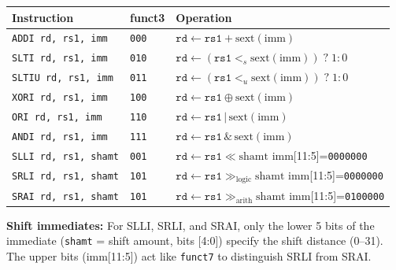 \documentclass[12pt, a4paper, oneside]{book}
\begin{document}
\begin{center}
\renewcommand{\arraystretch}{1.25}
\begin{tabular}{l l p{8cm}}
\toprule
\textbf{\color{purple}Instruction} & \textbf{\color{purple}funct3} & \textbf{\color{purple}Operation} \\
\midrule
\texttt{ADDI  rd, rs1, imm}  & \texttt{000} & $\texttt{rd} \leftarrow \texttt{rs1} + \text{sext}(\text{imm})$ \\
\texttt{SLTI  rd, rs1, imm}  & \texttt{010} & $\texttt{rd} \leftarrow (\texttt{rs1} <_s \text{sext}(\text{imm}))\;?\;1:0$ \\
\texttt{SLTIU rd, rs1, imm}  & \texttt{011} & $\texttt{rd} \leftarrow (\texttt{rs1} <_u \text{sext}(\text{imm}))\;?\;1:0$ \\
\texttt{XORI  rd, rs1, imm}  & \texttt{100} & $\texttt{rd} \leftarrow \texttt{rs1} \oplus \text{sext}(\text{imm})$ \\
\texttt{ORI   rd, rs1, imm}  & \texttt{110} & $\texttt{rd} \leftarrow \texttt{rs1} \,|\, \text{sext}(\text{imm})$ \\
\texttt{ANDI  rd, rs1, imm}  & \texttt{111} & $\texttt{rd} \leftarrow \texttt{rs1} \,\&\, \text{sext}(\text{imm})$ \\
\texttt{SLLI  rd, rs1, shamt}& \texttt{001} & $\texttt{rd} \leftarrow \texttt{rs1} \ll \text{shamt}$ \hfill {\scriptsize imm[11:5]=\texttt{0000000}} \\
\texttt{SRLI  rd, rs1, shamt}& \texttt{101} & $\texttt{rd} \leftarrow \texttt{rs1} \gg_\text{logic} \text{shamt}$ \hfill {\scriptsize imm[11:5]=\texttt{0000000}} \\
\texttt{SRAI  rd, rs1, shamt}& \texttt{101} & $\texttt{rd} \leftarrow \texttt{rs1} \gg_\text{arith} \text{shamt}$ \hfill {\scriptsize imm[11:5]=\texttt{0100000}} \\
\bottomrule
\end{tabular}
\end{center}

\begin{infobox}
\textbf{\color{accentblue}Shift immediates:}
For SLLI, SRLI, and SRAI, only the lower 5 bits of the immediate (\texttt{shamt} = shift amount, bits [4:0]) specify the shift distance (0--31). The upper bits (imm[11:5]) act like \texttt{funct7} to distinguish SRLI from SRAI.
\end{infobox}
\end{document}
